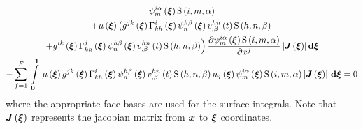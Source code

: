 \begin{multline}
  \idxgbfn{i}{m}{\alpha}{\vectr{\xi}}\idxgsf{i}{m}{\alpha}\\
  +\fnof{\mu}{\vectr{\xi}}\left(\fnof{g^{jk}}{\vectr{\xi}}\fnof{\christoffel{i}{k}{h}}{\vectr{\xi}}
    \idxgbfn{h}{n}{\beta}{\vectr{\xi}}
    \fnof{\idxnodedof{v}{h}{n}{\beta}}{t}\idxgsf{h}{n}{\beta}\right.\\
    \left.+\fnof{g^{ik}}{\vectr{\xi}}\fnof{\christoffel{j}{k}{h}}{\vectr{\xi}}\idxgbfn{h}{n}{\beta}{\vectr{\xi}}
    \fnof{\idxnodedof{v}{h}{n}{\beta}}{t}\idxgsf{h}{n}{\beta}\right)
    \delby{\idxgbfn{i}{m}{\alpha}{\vectr{\xi}}\idxgsf{i}{m}{\alpha}}{x^{j}}
    \abs{\fnof{\matr{J}}{\vectr{\xi}}}\exteriorderiv{\vectr{\xi}}\\
  -\gsum{f=1}{F}{\gint{\vectr{0}}{\vectr{1}}{\fnof{\mu}{\vectr{\xi}}
      \fnof{g^{jk}}{\vectr{\xi}}\fnof{\christoffel{i}{k}{h}}{\vectr{\xi}}\idxgbfn{h}{n}{\beta}{\vectr{\xi}}
      \fnof{\idxnodedof{v}{h}{n}{\beta}}{t}\idxgsf{h}{n}{\beta}\fnof{n_{j}}{\vectr{\xi}}
      \idxgbfn{i}{m}{\alpha}{\vectr{\xi}}\idxgsf{i}{m}{\alpha}\abs{\fnof{\matr{J}}{\vectr{\xi}}}}{\vectr{\xi}}}
  =0
  \label{eqn:NSEFEM3}
\end{multline}
where the appropriate face bases are used for the surface integrals. Note that
$\fnof{\matr{J}}{\vectr{\xi}}$ represents the jacobian matrix from $\boldsymbol{x}$
to $\boldsymbol{\xi}$ coordinates.

